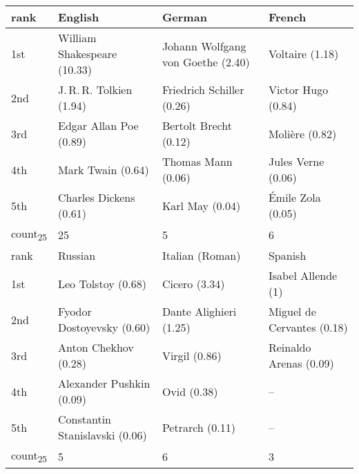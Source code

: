 \documentclass[a4paper,12pt]{scrartcl}
\begin{document}
\begin{table}
{\begin{tabular}{@{}llll@{}}
    rank                    &English                        &German                            &French             \\
    \midrule
    1st                     &William Shakespeare (10.33)    &Johann Wolfgang von Goethe (2.40) &Voltaire (1.18)    \\  
    2nd                     &J.\,R.\,R. Tolkien (1.94)      &Friedrich Schiller (0.26)         &Victor Hugo (0.84) \\   
    3rd                     &Edgar Allan Poe (0.89)         &Bertolt Brecht (0.12)             &Molière (0.82)     \\
    4th                     &Mark Twain (0.64)              &Thomas Mann (0.06)                &Jules Verne (0.06) \\
    5th                     &Charles Dickens (0.61)         &Karl May (0.04)                   &Émile Zola (0.05)  \\
    count\textsubscript{25} &25                             &5                                 &6                \\
    \midrule
    rank                    &Russian                        &Italian (Roman)                   &Spanish                     \\
    \midrule                
    1st                     &Leo Tolstoy (0.68)             &Cicero (3.34)                     &Isabel Allende (1)          \\
    2nd                     &Fyodor Dostoyevsky (0.60)      &Dante Alighieri (1.25)            &Miguel de Cervantes (0.18)  \\
    3rd                     &Anton Chekhov (0.28)           &Virgil (0.86)                     &Reinaldo Arenas (0.09)      \\
    4th                     &Alexander Pushkin (0.09)       &Ovid (0.38)                       &--                           \\
    5th                     &Constantin Stanislavski (0.06) &Petrarch (0.11)                   &--                           \\
    count\textsubscript{25} &5                              &6                                 &3                           \\


\end{tabular}}
\end{table}
\end{document}
